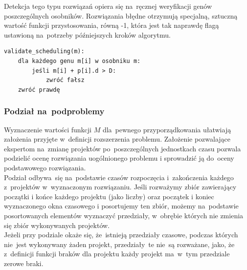 \documentclass[12pt,a4paper]{article}
\theoremstyle{definition}
\begin{document}
\noindent
Detekcja tego typu rozwiązań opiera się na~ręcznej weryfikacji genów poszczególnych osobników.
Rozwiązania błędne otrzymują specjalną, sztuczną wartość funkcji przystosowania, równą -1, która jest tak naprawdę flagą ustawioną na~potrzeby późniejszych kroków algorytmu.\\

\begin{tcolorbox}[title=Sprawdzenie poprawności pojedynczego rozwiązania]
\begin{verbatim}
validate_scheduling(m):
    dla każdego genu m[i] w osobniku m:
        jeśli m[i] + p[i].d > D:
            zwróć fałsz
    zwróć prawdę
\end{verbatim}	
\end{tcolorbox}

\subsubsection*{Podział na~podproblemy}
Wyznaczenie wartości funkcji $M$ dla~pewnego przyporządkowania ułatwiają założenia przyjęte w~definicji rozszerzenia problemu.
Założenie pozwalające ekspertom na~zmianę projektów po~poszczególnych jednostkach czasu pozwala podzielić ocenę rozwiązania uogólnionego problemu i sprowadzić ją do~oceny podstawowego rozwiązania.\\

\noindent
Podział odbywa~się na~podstawie czasów rozpoczęcia i~zakończenia każdego z~projektów w~wyznaczonym rozwiązaniu.
Jeśli rozważymy zbiór zawierający początki i końce każdego projektu (jako liczby) oraz początek i koniec wyznaczonego okna czasowego i posortujemy ten zbiór, możemy na~podstawie posortowanych elementów wyznaczyć przedziały, w~obrębie których nie zmienia się zbiór wykonywanych projektów. \\

\noindent
Jeżeli przy podziale okaże się, że~istnieją przedziały czasowe, podczas których nie~jest wykonywany żaden projekt, przedziały~te nie~są rozważane, jako, że z~definicji funkcji braków dla projektu każdy projekt ma~w~tym przedziale zerowe braki. \\ 
\end{document}
